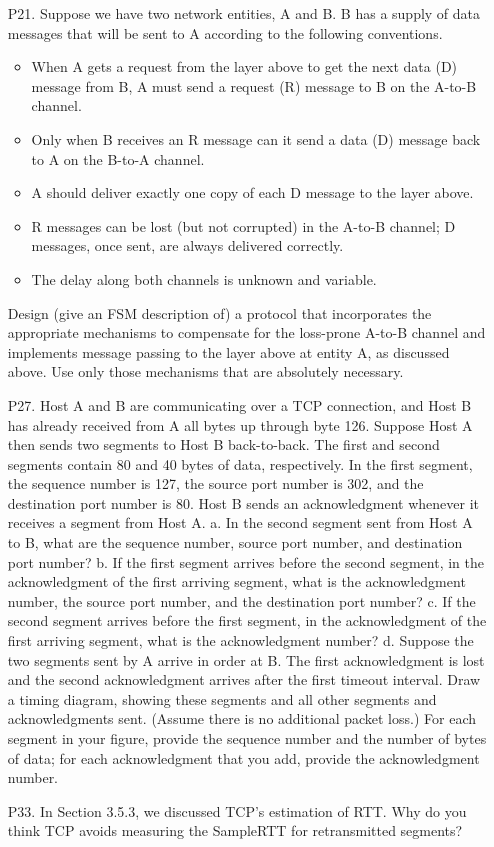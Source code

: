 \documentclass[]{article}
\begin{document}
\begin{enumerate}
		\item[P21.] Suppose we have two network entities, A and B. B has a supply of data messages that will be sent to A according to the following conventions. 
		\begin{itemize}
			\item When A gets a request from the layer above to get the next data (D) message from B, A must send a request (R) message to B on the A-to-B channel. 
			\item Only when B receives an R message can it send a data (D) message back to A on the B-to-A channel.
			\item A should deliver exactly one copy of each D message to the layer above.
			\item R messages can be lost (but not corrupted) in the A-to-B channel; D messages, once sent, are always delivered correctly.
			\item The delay along both channels is unknown and variable. 
		\end{itemize}
		
		Design (give an FSM description of) a protocol that incorporates the appropriate mechanisms to compensate for the loss-prone A-to-B channel and implements message passing to the layer above at entity A, as discussed above. Use only those mechanisms that are absolutely necessary.
		
		
		\item[P27.] Host A and B are communicating over a TCP connection, and Host B has already received from A all bytes up through byte 126. Suppose Host A then sends two segments to Host B back-to-back. The first and second segments	contain 80 and 40 bytes of data, respectively. In the first segment, the sequence number is 127, the source port number is 302, and the destination port number is 80. Host B sends an acknowledgment whenever it receives a segment from Host A.
		\subitem a. In the second segment sent from Host A to B, what are the sequence number, source port number, and destination port number?
		\subitem b. If the first segment arrives before the second segment, in the acknowledgment of the first arriving segment, what is the acknowledgment number, the source port number, and the destination port number?
		\subitem c. If the second segment arrives before the first segment, in the acknowledgment of the first arriving segment, what is the acknowledgment number?
		\subitem d. Suppose the two segments sent by A arrive in order at B. The first acknowledgment is lost and the second acknowledgment arrives after the first timeout interval. Draw a timing diagram, showing these segments and all other segments and acknowledgments sent. (Assume there is no additional packet loss.) For each segment in your figure, provide the sequence number and the number of bytes of data; for each acknowledgment that you add, provide the acknowledgment number.
		
		
		\newpage
		\item[P33.] In Section 3.5.3, we discussed TCP’s estimation of RTT. Why do you think TCP avoids measuring the SampleRTT for retransmitted segments?
		
	\end{enumerate}
\end{document}
